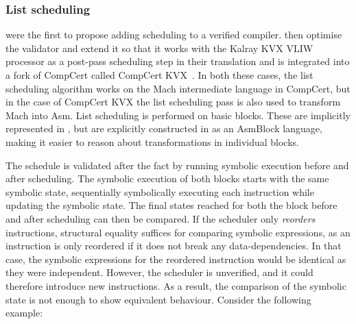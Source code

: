 \subsubsection{List scheduling}

\textcite{tristan08_formal_verif_trans_valid} were the first to propose adding
scheduling to a verified compiler.  \textcite{six20_certif_effic_instr_sched}
then optimise the validator and extend it so that it works with the Kalray KVX
\gls{VLIW} processor as a post-pass scheduling step in their translation and is
integrated into a fork of CompCert called CompCert KVX~\cite[]{six23_ck}.  In
both these cases, the list scheduling algorithm works on the \gls{Mach}
intermediate language in CompCert, but in the case of CompCert KVX the list
scheduling pass is also used to transform \gls{Mach} into \gls{Asm}.  List
scheduling is performed on \glspl{basic block}.  These are implicitly
represented in \textcite{tristan08_formal_verif_trans_valid}, but are explicitly
constructed in \textcite{six20_certif_effic_instr_sched} as an \gls{AsmBlock}
language, making it easier to reason about transformations in individual blocks.

The schedule is validated after the fact by running symbolic execution before
and after scheduling.  The symbolic execution of both blocks starts with the
same symbolic state, sequentially symbolically executing each instruction while
updating the symbolic state.  The final states reached for both the block before
and after scheduling can then be compared.  If the scheduler only
\emph{reorders} instructions, structural equality suffices for comparing
symbolic expressions, as an instruction is only reordered if it does not break
any data-dependencies.  In that case, the symbolic expressions for the reordered
instruction would be identical as they were independent.  However, the scheduler
is unverified, and it could therefore introduce new instructions.  As a result,
the comparison of the symbolic state is not enough to show equivalent behaviour.
Consider the following example:

\begin{center}
\end{center}

